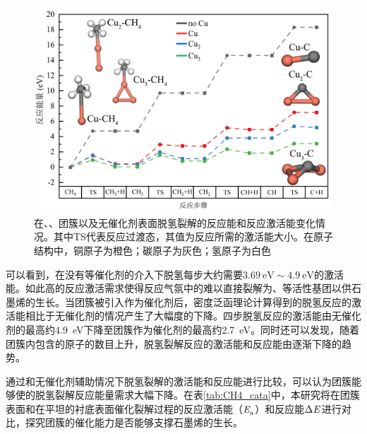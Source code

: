     \begin{figure}[htb]
        \includegraphics{pic/CG_DFT_CuCHx.png}
        \caption{在、、团簇以及无催化剂表面脱氢裂解的反应能和反应激活能变化情况。其中TS代表反应过渡态，其值为反应所需的激活能大小。在原子结构中，铜原子为橙色；碳原子为灰色；氢原子为白色}
        \label{fig:CG_DFT_CuCHx}
    \end{figure}

    可以看到，在没有等催化剂的介入下脱氢每步大约需要$\SI{3.69}{\electronvolt}\sim  \SI{4.9}{\electronvolt}$的激活能。如此高的反应激活需求使得反应气氛中的难以直接裂解为、等活性基团以供石墨烯的生长。当团簇被引入作为催化剂后，密度泛函理论计算得到的脱氢反应的激活能相比于无催化剂的情况产生了大幅度的下降。四步脱氢反应的激活能由无催化剂的最高约\SI{4.9}{\electronvolt}下降至团簇作为催化剂的最高约\SI{2.7}{\electronvolt}。同时还可以发现，随着团簇内包含的原子的数目上升，脱氢裂解反应的激活能和反应能由逐渐下降的趋势。

    通过和无催化剂辅助情况下脱氢裂解的激活能和反应能进行比较，可以认为团簇能够使的脱氢裂解反应能量需求大幅下降。在表\ref{tab:CH4_cata}中，本研究将在团簇表面和在平坦的衬底表面催化裂解过程的反应激活能（$\it E_{\rm a}^{\rm } \it$）和反应能$\rm{\Delta} \it \it E_{\rm }^{\rm } \it$进行对比，探究团簇的催化能力是否能够支撑石墨烯的生长。

    

